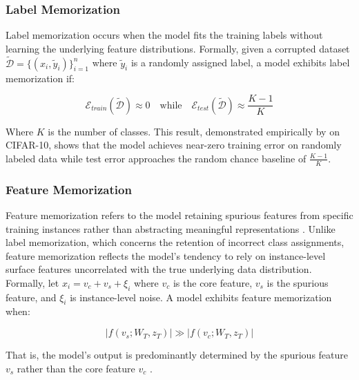 \subsubsection{Label Memorization}

Label memorization occurs when the model fits the training 
labels without learning the underlying feature distributions. 
Formally, given a corrupted dataset 
$\tilde{\mathcal{D}} = \{(x_i, \tilde{y}_i)\}_{i=1}^n$ 
where $\tilde{y}_i$ is a randomly assigned label, a model 
exhibits label memorization if:

\begin{equation}
\mathcal{E}_{train}(\tilde{\mathcal{D}}) \approx 0 
\quad \text{while} \quad 
\mathcal{E}_{test}(\tilde{\mathcal{D}}) \approx 
\frac{K-1}{K}
\label{eq:labelmem}
\end{equation}

Where $K$ is the number of classes. This result, 
demonstrated empirically by \cite{chiyuan_zhang_bd8f0549} on 
CIFAR-10, shows that the model achieves near-zero 
training error on randomly labeled data while test 
error approaches the random chance baseline of 
$\frac{K-1}{K}$.

\subsubsection{Feature Memorization}

Feature memorization refers to the model retaining 
spurious features from specific training instances 
rather than abstracting meaningful representations 
\cite{simone_bombari_23e6de9b,yang_yu_4720d432}. Unlike 
label memorization, which concerns the retention of 
incorrect class assignments, feature memorization 
reflects the model's tendency to rely on instance-level 
surface features uncorrelated with the true underlying 
data distribution. Formally, let $x_i = v_c + v_s + \xi_i$ 
where $v_c$ is the core feature, $v_s$ is the spurious 
feature, and $\xi_i$ is instance-level noise. A model 
exhibits feature memorization when:

\begin{equation}
|f(v_s; W_T, z_T)| \gg |f(v_c; W_T, z_T)|
\label{eq:featuremem}
\end{equation}

That is, the model's output is predominantly determined 
by the spurious feature $v_s$ rather than the core 
feature $v_c$ \cite{yang_yu_4720d432}.